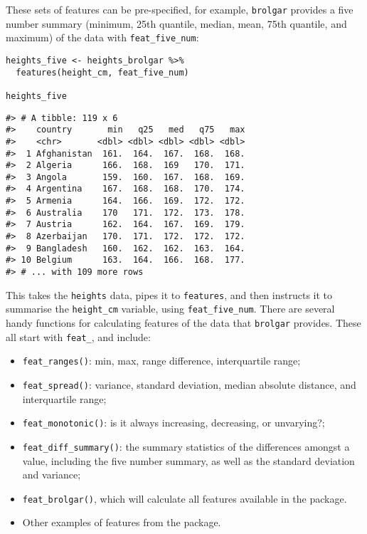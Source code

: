 These sets of features can be pre-specified, for example, \texttt{brolgar} provides a five number summary (minimum, 25th quantile, median, mean, 75th quantile, and maximum) of the data with \texttt{feat\_five\_num}:

\begin{verbatim}
heights_five <- heights_brolgar %>%
  features(height_cm, feat_five_num)

heights_five
\end{verbatim}

\begin{verbatim}
#> # A tibble: 119 x 6
#>    country       min   q25   med   q75   max
#>    <chr>       <dbl> <dbl> <dbl> <dbl> <dbl>
#>  1 Afghanistan  161.  164.  167.  168.  168.
#>  2 Algeria      166.  168.  169   170.  171.
#>  3 Angola       159.  160.  167.  168.  169.
#>  4 Argentina    167.  168.  168.  170.  174.
#>  5 Armenia      164.  166.  169.  172.  172.
#>  6 Australia    170   171.  172.  173.  178.
#>  7 Austria      162.  164.  167.  169.  179.
#>  8 Azerbaijan   170.  171.  172.  172.  172.
#>  9 Bangladesh   160.  162.  162.  163.  164.
#> 10 Belgium      163.  164.  166.  168.  177.
#> # ... with 109 more rows
\end{verbatim}

This takes the \texttt{heights} data, pipes it to \texttt{features}, and then instructs it to summarise the \texttt{height\_cm} variable, using \texttt{feat\_five\_num}. There are several handy functions for calculating features of the data that
\texttt{brolgar} provides. These all start with \texttt{feat\_}, and include:

\begin{itemize}
\tightlist
\item
  \texttt{feat\_ranges()}: min, max, range difference, interquartile range;
\item
  \texttt{feat\_spread()}: variance, standard deviation, median absolute distance, and interquartile range;
\item
  \texttt{feat\_monotonic()}: is it always increasing, decreasing, or unvarying?;
\item
  \texttt{feat\_diff\_summary()}: the summary statistics of the differences amongst a value, including the five number summary, as well as the standard deviation and variance;
\item
  \texttt{feat\_brolgar()}, which will calculate all features available in the  package.
\item
  Other examples of features from the  package.
\end{itemize}

